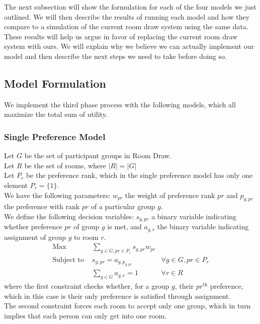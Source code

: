 \documentclass[12pt]{article}
\begin{document}
   The next subsection will show the formulation for each of the four models we just outlined. We will then describe the results of running each model and how they compare to a simulation of the current room draw system using the same data. These results will help us argue in favor of replacing the current room draw system with ours. We will explain why we believe we can actually implement our model and then describe the next steps we need to take before doing so. 
    
    \subsection*{Model Formulation}
    We implement the third phase process with the following models, which all maximize the total sum of utility.
    \subsubsection*{Single Preference Model}
    Let $G$ be the set of participant groups in Room Draw. \\
    Let $R$ be the set of rooms, where $|R| = |G|$ \\
    Let $P_r$ be the preference rank, which in the single preference model has only one element $P_r =\{1\}$. \\
We have the following parameters: $w_{pr}$ the weight of preference rank $pr$ and $p_{g,pr}$ the preference with rank $pr$ of a particular group $g$. \\
    We define the following decision variables: $s_{g,pr}$ a binary variable indicating whether preference $pr$ of group $g$ is met, and $a_{g,r}$ the binary variable indicating assignment of group $g$ to room $r$. 
    \begin{align*}
    \text{Max} &\sum_{g \in G, pr \in P_r} s_{g,pr}w_{pr}  & \\
    \text{Subject to } &s_{g,pr} = a_{g,p_{g,pr}} &\forall g \in G, pr \in P_r\\ 
    &\sum_{g \in G} a_{g,r} = 1 &\forall r \in R
    \end{align*}
    where the first constraint checks whether, for a group $g$, their $pr^{\text{th}}$ preference, which in this case is their only preference is satisfied through assignment. \\
    The second constraint forces each room to accept only one group, which in turn implies that each person can only get into one room.
    
\end{document}
